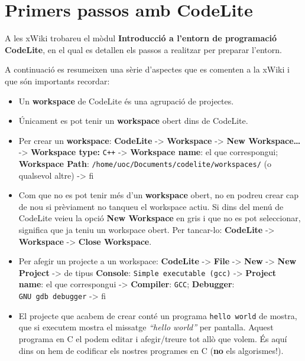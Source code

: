 \documentclass[
]{book}
\providecommand{\tightlist}{%
  \setlength{\itemsep}{0pt}\setlength{\parskip}{0pt}}
\begin{document}
\hypertarget{primers-passos-amb-codelite}{%
\section{Primers passos amb CodeLite}\label{primers-passos-amb-codelite}}

A les xWiki trobareu el mòdul \textbf{Introducció a l'entorn de programació CodeLite}, en el qual es detallen els passos a realitzar per preparar l'entorn.

A continuació es resumeixen una sèrie d'aspectes que es comenten a la xWiki i que són importants recordar:

\begin{itemize}
\tightlist
\item
  Un \textbf{workspace} de CodeLite és una agrupació de projectes.
\item
  Únicament es pot tenir un \textbf{workspace} obert dins de CodeLite.
\item
  Per crear un \textbf{workspace}: \textbf{CodeLite} -\textgreater{} \textbf{Workspace} -\textgreater{} \textbf{New Workspace\ldots{}} -\textgreater{} \textbf{Workspace type:} \texttt{C++} -\textgreater{} \textbf{Workspace name}: el que correspongui; \textbf{Workspace Path}: \texttt{/home/uoc/Documents/codelite/workspaces/} (o qualsevol altre) -\textgreater{} fi
\item
  Com que no es pot tenir més d'un \textbf{workspace} obert, no en podreu crear cap de nou si prèviament no tanqueu el workspace actiu. Si dins del menú de CodeLite veieu la opció \textbf{New Workspace} en gris i que no es pot seleccionar, significa que ja teniu un workspace obert. Per tancar-lo: \textbf{CodeLite} -\textgreater{} \textbf{Workspace} -\textgreater{} \textbf{Close Workspace}.
\item
  Per afegir un projecte a un workspace: \textbf{CodeLite} -\textgreater{} \textbf{File} -\textgreater{} \textbf{New} -\textgreater{} \textbf{New Project} -\textgreater{} de tipus \textbf{Console}: \texttt{Simple\ executable\ (gcc)} -\textgreater{} \textbf{Project name}: el que correspongui -\textgreater{} \textbf{Compiler}: \texttt{GCC}; \textbf{Debugger}: \texttt{GNU\ gdb\ debugger} -\textgreater{} fi
\item
  El projecte que acabem de crear conté un programa \texttt{hello\ world} de mostra, que si executem mostra el missatge \emph{``hello world''} per pantalla. Aquest programa en C el podem editar i afegir/treure tot allò que volem. És aquí dins on hem de codificar els nostres programes en C (\textbf{no} els algorismes!).

\end{itemize}
\end{document}
